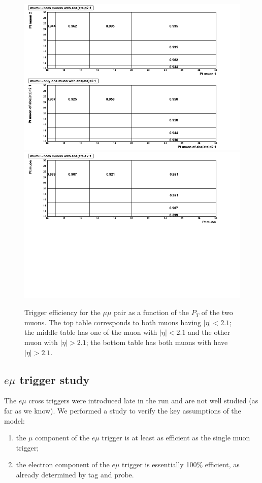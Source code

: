 \begin{figure}[tbh]
\begin{center}
\includegraphics[width=0.99\linewidth]{mumuModel.png}
\includegraphics[width=0.99\linewidth]{mumu24Model.png}
\caption{\label{fig:mumuModel}\protect Trigger efficiency for the
$\mu\mu$ pair as a function of the $P_T$ of the two muons.
The top table corresponds to both muons having $|\eta| < 2.1$;
the middle table has one of the muon with $|\eta|<2.1$ and the
other muon with $|\eta|>2.1$; the bottom table has both muons with 
have $|\eta|>2.1$.}
\end{center}
\end{figure}

\clearpage

\subsection{$e\mu$ trigger study}
\label{sec:emutrg}
The $e\mu$ cross triggers were introduced late in the run and are
not well studied (as far as we know).  We performed a study to verify 
the key assumptions of the model:
\begin{enumerate}
\item the $\mu$ component of the $e\mu$ trigger is at least as efficient
as the single muon trigger; 
\item the electron component of the $e\mu$ trigger is essentially 100\% efficient,
as already determined by tag and probe.
\end{enumerate}

